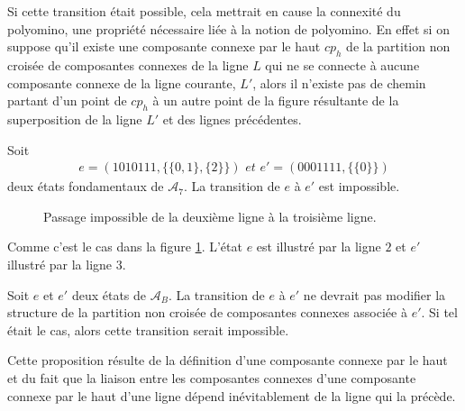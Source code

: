 \begin{Pre}
Si cette transition était possible, cela mettrait en cause la connexité du polyomino, une propriété nécessaire liée à la notion de polyomino. En effet si on suppose qu'il existe une composante connexe par le haut $cp_{h}$ de la partition non croisée de composantes connexes   de la ligne $L$ qui ne se connecte à aucune composante connexe de la ligne courante, $L'$, alors  il n'existe pas de chemin partant d'un point  de $cp_{h}$ à un autre point de la figure résultante de la superposition de la ligne $L'$ et des lignes précédentes.
\end{Pre}
\begin{Ex}\label{ex5}
Soit 
\begin{eqnarray*}
e=(1010111,\{\{0,1\},\{2\}\}) \textit{ et } e'=(0001111,\{\{0\}\})
\end{eqnarray*}
deux états fondamentaux de $\mathcal{A}_{7}$. La transition de $e$ à $e'$ est impossible.
\begin{figure}[!htb]
\begin{minipage}[c]{.26\linewidth}
        \centering
\end{minipage}
\hfill
\begin{minipage}[c]{.6\linewidth}
        \centering
\begin{logicpuzzle}[rows=3,columns=7,color=cyan!100, width=750px,scale=0.5]
\framepuzzle[black!50]
\end{logicpuzzle}
\end{minipage}
\caption{\label{Atfig5} Passage impossible de la deuxième ligne à la troisième ligne.}
\end{figure} 
Comme c'est le cas dans la figure \ref{Atfig5}. L'état $e$ est illustré par la ligne $2$ et $e'$ illustré par la ligne $3$.
\end{Ex}
\begin{Prop}\label{prop2}
Soit $e$ et $e'$ deux états de $\mathcal{A}_{B}$. La transition de $e$ à $e'$ ne devrait pas modifier la structure de la partition non croisée de composantes connexes    associée à $e'$. Si tel était le cas, alors cette transition serait impossible.
\end{Prop}
\begin{Pre}
Cette proposition résulte de la définition d'une composante connexe par le haut et du fait que la liaison entre les composantes connexes d'une composante connexe par le haut d'une ligne dépend inévitablement de la ligne qui la précède.
\end{Pre}
